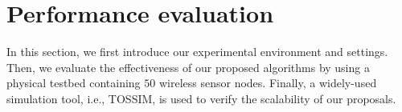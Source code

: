 \documentclass[prodmode,acmtosn]{acmsmall}
\begin{document}
%

\section{Performance evaluation}
\label{section_evaluation}
In this section, we first introduce our experimental environment and settings. Then, we evaluate the effectiveness of our proposed algorithms by using a physical testbed containing $50$ wireless sensor nodes. Finally, a widely-used simulation tool, i.e., TOSSIM, is used to verify the scalability of our proposals.
\end{document}
